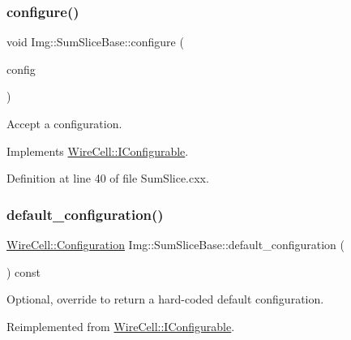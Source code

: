 \subsubsection{\texorpdfstring{configure()}{configure()}}
{\footnotesize\ttfamily void Img\+::\+Sum\+Slice\+Base\+::configure (\begin{DoxyParamCaption}\item[{const \hyperlink{namespace_wire_cell_a9f705541fc1d46c608b3d32c182333ee}{Wire\+Cell\+::\+Configuration} \&}]{config }\end{DoxyParamCaption})\hspace{0.3cm}{\ttfamily [virtual]}}



Accept a configuration. 



Implements \hyperlink{class_wire_cell_1_1_i_configurable_a57ff687923a724093df3de59c6ff237d}{Wire\+Cell\+::\+I\+Configurable}.



Definition at line 40 of file Sum\+Slice.\+cxx.

\mbox{\label{class_wire_cell_1_1_img_1_1_sum_slice_base_a2df3fdb91e31ad9d5051537bdc3ee124}} 
\subsubsection{\texorpdfstring{default\+\_\+configuration()}{default\_configuration()}}
{\footnotesize\ttfamily \hyperlink{namespace_wire_cell_a9f705541fc1d46c608b3d32c182333ee}{Wire\+Cell\+::\+Configuration} Img\+::\+Sum\+Slice\+Base\+::default\+\_\+configuration (\begin{DoxyParamCaption}{ }\end{DoxyParamCaption}) const\hspace{0.3cm}{\ttfamily [virtual]}}



Optional, override to return a hard-\/coded default configuration. 



Reimplemented from \hyperlink{class_wire_cell_1_1_i_configurable_a54841b2da3d1ea02189478bff96f7998}{Wire\+Cell\+::\+I\+Configurable}.



